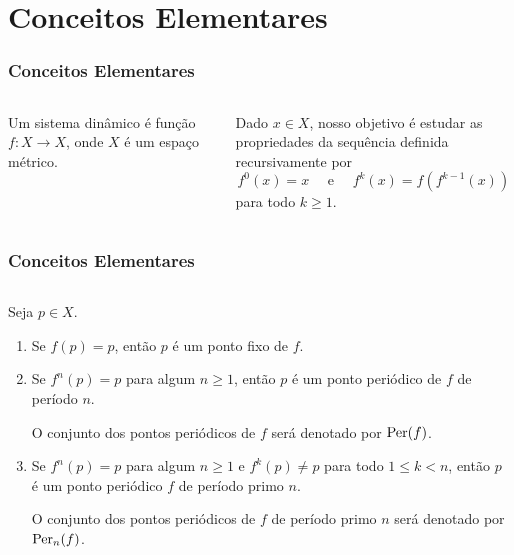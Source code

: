 \section{Conceitos Elementares}


\begin{frame}
\frametitle{Conceitos Elementares}
\begin{columns}
\column{\dimexpr\paperwidth-15pt}

\begin{definition}
Um sistema dinâmico é função $f: X \to X$, onde $X$ é um espaço métrico.
\end{definition}

Dado $x \in X$, nosso objetivo é estudar as propriedades da sequência definida recursivamente por
$$f^0(x) = x \quad \text{ e } \quad f^k(x) = f(f^{k-1}(x))$$
para todo $k \geq 1$.

\end{columns}
\end{frame}


\begin{frame}
\vspace{5pt}
\frametitle{Conceitos Elementares}      
\begin{columns}
\column{\dimexpr\paperwidth-15pt}


\begin{definition}
Seja $p \in X$.
\begin{enumerate}
\item Se $f(p) = p$, então $p$ é um ponto fixo de $f$.

\item Se $f^n(p) = p$ para algum $n \geq 1$, então $p$ é um ponto periódico de $f$ de período $n$.

O conjunto dos pontos periódicos de $f$ será denotado por $\operatorname{Per}(f)$.

\item Se $f^n(p) = p$ para algum $n \geq 1$ e $f^k(p) \neq p$ para todo $1 \leq k < n$, então $p$ é um ponto periódico $f$ de período primo $n$.

O conjunto dos pontos periódicos de $f$ de período primo $n$ será denotado por $\operatorname{Per}_n(f)$.
\end{enumerate}
\end{definition}

\end{columns}
\end{frame}

